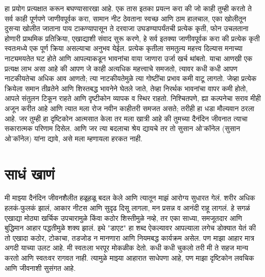 हा प्रयोग प्रत्यक्षात करून बघण्यासारखा आहे. एक तास इतका प्रयत्न करा की जो काही तुम्ही करतो ते सर्व काही पूर्णपणे जाणीवपूर्वक करा, सामान नीट ठेवताना स्वच्छ आणि ठाम हालचाल, एका खोलीतून दुसऱ्या खोलीत जाताना पाय टाकण्यापासून ते दरवाजा उघडण्यापर्यंतची प्रत्येक कृती, फोन उचलताना होणारी प्राथमिक प्रतिक्रिया, एखाद्याशी संवाद सुरू करणे, हे सर्व इतक्या जाणीवपूर्वक करा की प्रत्येक कृती स्वतःमध्ये एक पूर्ण क्रिया असल्याचा अनुभव येईल. प्रत्येक कृतीला समतुल्य महत्त्व दिल्यास मनाच्या नाट्यमयतेत घट होते आणि आपल्याकडून भावनांचा वाया जाणारा उर्जा खर्च थांबतो.
याचा आणखी एक प्रत्यक्ष लाभ असा आहे की आपण जे काही अत्यधिक महत्त्वाचे समजतो, त्यावर कधी कधी आपण नाटकीयतेचा अधिक आव आणतो; त्या नाटकीयतेमुळे त्या गोष्टींचा प्रभाव कमी वाटू लागतो. जेव्हा प्रत्येक क्रियेला समान तीव्रतेने आणि शिस्तबद्ध भावनेने घेतले जाते, तेव्हा निरर्थक भावनांचा वापर कमी होतो, आपले संतुलन टिकून राहते आणि दृष्टीकोन व्यापक व स्थिर राहतो.
निश्चितपणे, ह्या कल्पनेचा सराव मीही अजून करीत आहे आणि त्यात मला रोज नवीन काहीतरी समजत असते; तरीही हा धडा मौल्यवान ठरला आहे. जर तुम्ही हा दृष्टिकोन आत्मसात केला तर मला खात्री आहे की तुमच्या दैनंदिन जीवनात त्याचा सकारात्मक परिणाम दिसेल. आणि जर त्या बदलाचा श्रेय द्यायचे तर तो सुसान ओ’कॉनेल (सुसान ओ’कॉनेल) यांना द्यावे, असे मला म्हणायला हरकत नाही.

 \chapter{साधं खाणं}
मी माझ्या दैनंदिन जीवनशैलीत हळूहळू बदल केले आणि त्यातून माझं आरोग्य सुधारत गेलं. शरीर अधिक हलकं-फुलकं झालं, आकार नीटस आणि सुदृढ दिसू लागला, मन प्रसन्न व आनंदी राहू लागलं. हे सगळं एखाद्या मोठ्या खर्चिक उपचारामुळे किंवा कठोर शिस्तीमुळे नव्हे, तर एका साध्या, समजूतदार आणि बुद्धिमान आहार पद्धतीमुळे शक्य झालं.
इथे "डाएट" हा शब्द ऐकल्यावर आपल्याला लगेच डोक्यात येतं की तो एखादा कठोर, टोकाचा, तडजोड न मानणारा आणि नियमबद्ध कार्यक्रम असेल. पण माझा आहार मात्र अगदी याच्या उलट आहे. मी स्वतःला भरपूर मोकळीक देतो. कधी कधी चुकलो तरी मी ते सहज मान्य करतो आणि स्वतःवर रागवत नाही. त्यामुळे माझ्या आहारात साधेपणा आहे, पण माझा दृष्टिकोन लवचिक आणि जीवनाशी सुसंगत आहे.
